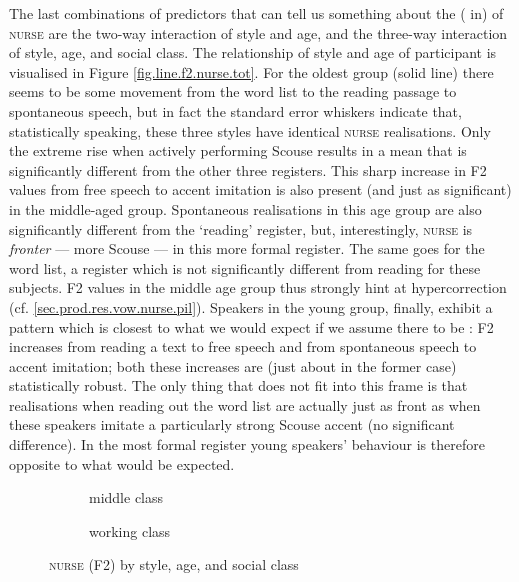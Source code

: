 The last combinations of predictors that can tell us something about the ( in)  of \textsc{nurse} are the two-way interaction of style and age, and the three-way interaction of style, age, and social class.
The relationship of style and age of participant is visualised in Figure \ref{fig.line.f2.nurse.tot}.
For the oldest group (solid line) there seems to be some movement from the word list to the reading passage to spontaneous speech, but in fact the standard error whiskers indicate that, statistically speaking, these three styles have identical \textsc{nurse} realisations.
Only the extreme rise when actively performing Scouse results in a mean that is significantly different from the other three registers.
This sharp increase in F2 values from free speech to accent imitation is also present (and just as significant) in the middle-aged group.
Spontaneous realisations in this age group are also significantly different from the `reading' register, but, interestingly, \textsc{nurse} is \emph{fronter} --- more Scouse --- in this more formal register.
The same goes for the word list, a register which is not significantly different from reading for these subjects.
F2 values in the middle age group thus strongly hint at hypercorrection (cf. \ref{sec.prod.res.vow.nurse.pil}).
Speakers in the young group, finally, exhibit a pattern which is closest to what we would expect if we assume there to be : F2 increases from reading a text to free speech and from spontaneous speech to accent imitation; both these increases are (just about in the former case) statistically robust.
The only thing that does not fit into this frame is that realisations when reading out the word list are actually just as front as when these speakers imitate a particularly strong Scouse accent (no significant difference).
In the most formal register young speakers' behaviour is therefore opposite to what would be expected.

\begin{figure}[h!]
	\centering
	\begin{subfigure}{.49\textwidth}
		\centering
			\resizebox{\linewidth}{!}{} 
		\caption{middle class}
		\label{fig.line.f2.nurse.mc}
	\end{subfigure}
	\begin{subfigure}{.49\textwidth}
		\centering
			\resizebox{\linewidth}{!}{} 
		\caption{working class}
		\label{fig.line.f2.nurse.wc}
	\end{subfigure}
	\caption{\textsc{nurse} (F2) by style, age, and social class}
\end{figure}

